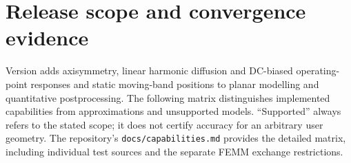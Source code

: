 \section{Release scope and convergence evidence}
\label{sec:status}
Version \luafemmversion{} adds axisymmetry, linear harmonic diffusion and DC-biased
operating-point responses and static moving-band positions to planar modelling and quantitative postprocessing. The following matrix distinguishes implemented capabilities from
approximations and unsupported models. ``Supported'' always refers to the stated
scope; it does not certify accuracy for an arbitrary user geometry.
The repository's \nolinkurl{docs/capabilities.md} provides the detailed matrix,
including individual test sources and the separate FEMM exchange restrictions.

